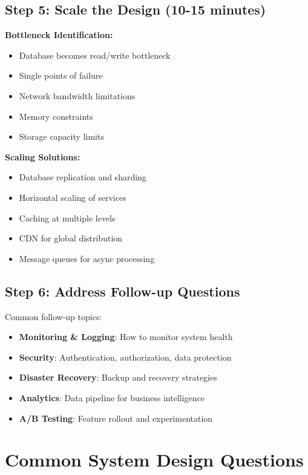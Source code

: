 \documentclass[10pt,a4paper]{article}
\begin{document}
\subsection{Step 5: Scale the Design (10-15 minutes)}

\begin{scaleBox}
\textbf{Bottleneck Identification:}
\begin{itemize}
\item Database becomes read/write bottleneck
\item Single points of failure
\item Network bandwidth limitations
\item Memory constraints
\item Storage capacity limits
\end{itemize}

\textbf{Scaling Solutions:}
\begin{itemize}
\item Database replication and sharding
\item Horizontal scaling of services
\item Caching at multiple levels
\item CDN for global distribution
\item Message queues for async processing
\end{itemize}
\end{scaleBox}

\subsection{Step 6: Address Follow-up Questions}

Common follow-up topics:
\begin{itemize}
\item \textbf{Monitoring \& Logging}: How to monitor system health
\item \textbf{Security}: Authentication, authorization, data protection
\item \textbf{Disaster Recovery}: Backup and recovery strategies
\item \textbf{Analytics}: Data pipeline for business intelligence
\item \textbf{A/B Testing}: Feature rollout and experimentation
\end{itemize}

\section{Common System Design Questions}
\end{document}
